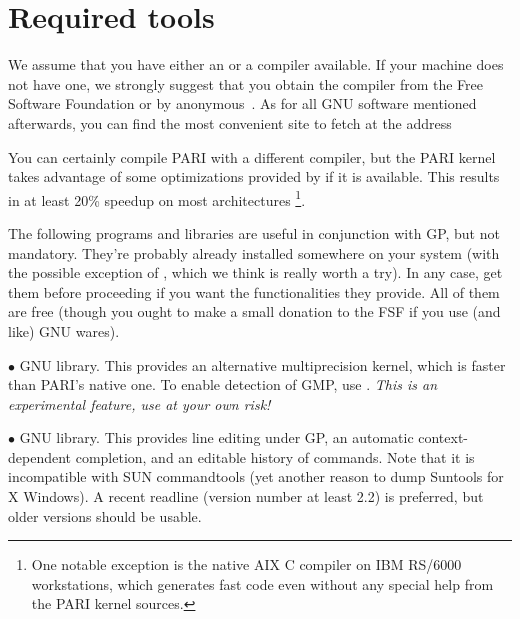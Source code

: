 %
%

\def\tocwrite#1{}
\section{Required tools}

We assume that you have either an  or a  compiler
available. If your machine does not have one, we strongly suggest that you
obtain the  compiler from the Free Software Foundation or by
anonymous~. As for all GNU software mentioned afterwards, you can
find the most convenient site to fetch  at the address


\noindent
You can certainly compile PARI with a different compiler, but the PARI
kernel takes advantage of some optimizations provided by  if it is
available. This results in at least 20\% speedup on most architectures%
\footnote*{One notable exception is the native AIX C compiler on IBM
RS/6000 workstations, which generates fast code even without any special
help from the PARI kernel sources.}.

 The following programs and libraries are useful
in conjunction with GP, but not mandatory. They're probably already installed
somewhere on your system (with the possible exception of ,
which we think is really worth a try). In any case, get them before
proceeding if you want the functionalities they provide. All of them are free
(though you ought to make a small donation to the FSF if you use (and like)
GNU wares).

  $\bullet$ GNU  library. This provides an alternative multiprecision
kernel, which is faster than PARI's native one. To enable detection of GMP,
use . \emph{This is an experimental feature, use at
your own risk!}

  $\bullet$ GNU  library. This provides line editing under GP,
an automatic context-dependent completion, and an editable history of
commands. Note that it is incompatible with SUN commandtools (yet another
reason to dump Suntools for X Windows). A recent readline (version number at
least 2.2) is preferred, but older versions should be usable.

